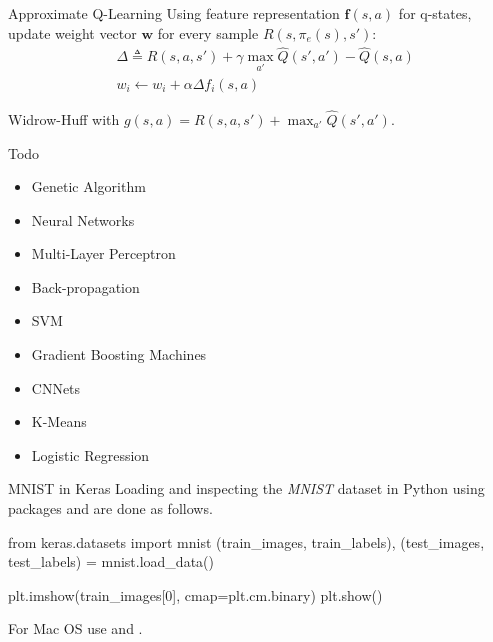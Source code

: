 \documentclass{cognito}
\begin{document}
\begin{note}{Approximate Q-Learning}
	Using feature representation $\mathbf{f}(s,a)$ for q-states, update weight vector $\mathbf{w}$
	for every sample $R(s, \pi_e(s), s')$:
	\begin{align*}
		&\textstyle \Delta \triangleq R(s, a, s') + \gamma \max_{a'} \hat{Q}(s',a') - \hat{Q}(s, a)\\
		&\textstyle w_i \leftarrow w_i + \alpha \Delta f_i(s, a)
	\end{align*}%
	\begin{remark} Widrow-Huff with $g(s,a) = R(s, a, s') + \max_{a'} \hat{Q}(s',a') $.\end{remark}
	\vspace{-5pt}
\end{note}



\begin{question}{Todo}
	\begin{itemize}
		\item Genetic Algorithm
		\item Neural Networks
		\item Multi-Layer Perceptron
		\item Back-propagation
		\item SVM
		\item Gradient Boosting Machines
		\item CNNets
		\item K-Means
		\item Logistic Regression
	\end{itemize}
\end{question}



\begin{note}{MNIST in Keras}
	Loading and inspecting the {\it MNIST} dataset in Python using packages  and 
	are done as follows.
	\begin{largecode}
 from keras.datasets import mnist
 (train_images, train_labels),
 	(test_images, test_labels) = mnist.load_data()
	\end{largecode}
	\vspace{-5pt}
	\begin{largecode}
 plt.imshow(train_images[0], cmap=plt.cm.binary) 
 plt.show()
	\end{largecode}
	\begin{remark} For Mac OS  use  and . \end{remark}\vspace{-5pt}
\end{note}
\end{document}
